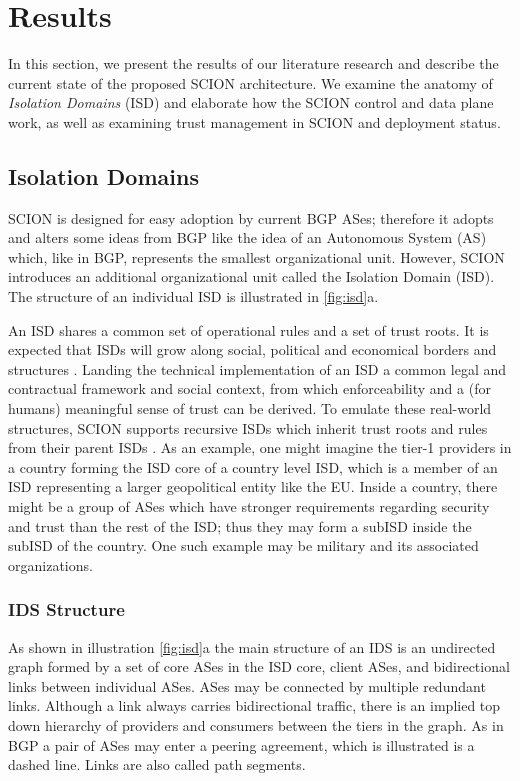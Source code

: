 \documentclass[../eva1_scion.tex]{subfiles}
\begin{document}
    
\section{Results} \label{sec:results}
    In this section, we present the results of our literature research and describe the current state of the proposed SCION architecture. We examine the anatomy of \textit{Isolation Domains} (ISD) and elaborate how the SCION control and data plane work, as well as examining trust management in SCION and deployment status.

    \subsection{Isolation Domains} \label{ssec:isd}
    SCION is designed for easy adoption by current BGP ASes; therefore it adopts and alters some ideas from BGP like the idea of an Autonomous System (AS) which, like in BGP, represents the smallest organizational unit. However, SCION introduces an additional organizational unit called the Isolation Domain (ISD). The structure of an individual ISD is illustrated in \ref{fig:isd}a. 

            An ISD shares a common set of operational rules and a set of trust roots. It is expected that ISDs will grow along social, political and economical borders and structures \cite{scion_2011}. Landing the technical implementation of an ISD a common legal and contractual framework and social context, from which enforceability and a (for humans) meaningful sense of trust can be derived. To emulate these real-world structures, SCION supports recursive ISDs  which inherit trust roots and rules from their parent ISDs \cite{scion_2011}. As an example, one might imagine the tier-1 providers in a country forming the ISD core of a country level ISD, which is a member of an ISD representing a larger geopolitical entity like the EU. Inside a country, there might be a group of ASes which have stronger requirements regarding security and trust than the rest of the ISD; thus they may form a subISD inside the subISD of the country. One such example may be military and its associated organizations.


    \subsubsection{IDS Structure} \label{sssec:isd_structure}
    As shown in illustration \ref{fig:isd}a the main structure of an IDS is an undirected graph formed by a set of core ASes in the ISD core, client ASes, and bidirectional links between individual ASes. ASes may be connected by multiple redundant links. Although a link always carries bidirectional traffic, there is an implied top down hierarchy of providers and consumers between the tiers in the graph. As in BGP a pair of ASes may enter a peering agreement, which is illustrated is a dashed line. Links are also called path segments.
\end{document}
